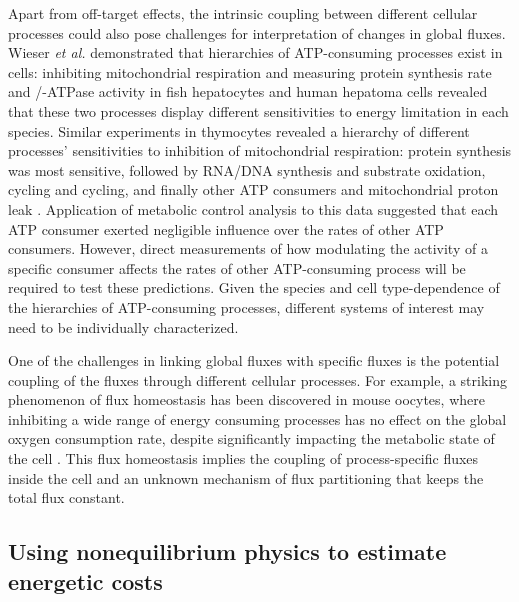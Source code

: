 \documentclass{compactarticle}
\begin{document}
Apart from off-target effects, the intrinsic coupling between different cellular processes could also pose challenges for interpretation of changes in global fluxes. Wieser \textit{et al.} \cite{wieser2001hierarchies} demonstrated that hierarchies of ATP-consuming processes exist in cells: inhibiting mitochondrial respiration and measuring protein synthesis rate and /-ATPase activity in fish hepatocytes and human hepatoma cells revealed that these two processes display different sensitivities to energy limitation in each species. Similar experiments in thymocytes revealed a hierarchy of different processes' sensitivities to inhibition of mitochondrial respiration: protein synthesis was most sensitive, followed by RNA/DNA synthesis and substrate oxidation,  cycling and  cycling, and finally other ATP consumers and mitochondrial proton leak \cite{buttgereit1995hierarchy}. Application of metabolic control analysis to this data suggested that each ATP consumer exerted negligible influence over the rates of other ATP consumers. However, direct measurements of how modulating the activity of a specific consumer affects the rates of other ATP-consuming process will be required to test these predictions. Given the species and cell type-dependence of the hierarchies of ATP-consuming processes, different systems of interest may need to be individually characterized.

One of the challenges in linking global fluxes with specific fluxes is the potential coupling of the fluxes through different cellular processes. For example, a striking phenomenon of flux homeostasis has been discovered in mouse oocytes, where inhibiting a wide range of energy consuming processes has no effect on the global oxygen consumption rate, despite significantly impacting the metabolic state of the cell \cite{Yang2021elife}. This flux homeostasis implies the coupling of process-specific fluxes inside the cell and an unknown mechanism of flux partitioning that keeps the total flux constant.

\subsection{Using nonequilibrium physics to estimate energetic costs}
\end{document}
